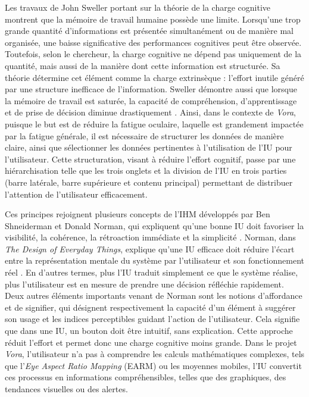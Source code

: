 \documentclass{rapportbrebeuf}
\begin{document}
Les travaux de John Sweller portant sur la théorie de la charge cognitive montrent que la mémoire de travail humaine possède une limite. Lorsqu’une trop grande quantité d’informations est présentée simultanément ou de manière mal organisée, une baisse significative des performances cognitives peut être observée. Toutefois, selon le chercheur, la charge cognitive ne dépend pas uniquement de la quantité, mais aussi de la manière dont cette information est structurée. Sa théorie détermine cet élément comme la charge extrinsèque : l’effort inutile généré par une structure inefficace de l’information. Sweller démontre aussi que lorsque la mémoire de travail est saturée, la capacité de compréhension, d’apprentissage et de prise de décision diminue drastiquement \cite{sweller1988cognitive}. Ainsi, dans le contexte de \textit{Vora}, puisque le but est de réduire la fatigue oculaire, laquelle est grandement impactée par la fatigue générale, il est nécessaire de structurer les données de manière claire, ainsi que sélectionner les données pertinentes à l’utilisation de l’IU pour l’utilisateur. Cette structuration, visant à réduire l’effort cognitif, passe par une hiérarchisation telle que les trois onglets et la division de l’IU en trois parties (barre latérale, barre supérieure et contenu principal) permettant de distribuer l’attention de l’utilisateur efficacement.

Ces principes rejoignent plusieurs concepts de l’IHM développés par Ben Shneiderman et Donald Norman, qui expliquent qu’une bonne IU doit favoriser la visibilité, la cohérence, la rétroaction immédiate et la simplicité \cite{shneiderman_golden_rules}. Norman, dans \textit{The Design of Everyday Things}, explique qu’une IU efficace doit réduire l’écart entre la représentation mentale du système par l’utilisateur et son fonctionnement réel \cite{norman2013design}. En d'autres termes, plus l’IU traduit simplement ce que le système réalise, plus l’utilisateur est en mesure de prendre une décision réfléchie rapidement. Deux autres éléments importants venant de Norman sont les notions d’affordance et de signifier, qui désignent respectivement la capacité d’un élément à suggérer son usage et les indices perceptibles guidant l’action de l’utilisateur. Cela signifie que dans une IU, un bouton doit être intuitif, sans explication. Cette approche réduit l’effort et permet donc une charge cognitive moins grande. Dans le projet \textit{Vora}, l’utilisateur n’a pas à comprendre les calculs mathématiques complexes, tels que l’\textit{Eye Aspect Ratio Mapping} (EARM) ou les moyennes mobiles, l’IU convertit ces processus en informations compréhensibles, telles que des graphiques, des tendances visuelles ou des alertes.
\end{document}
